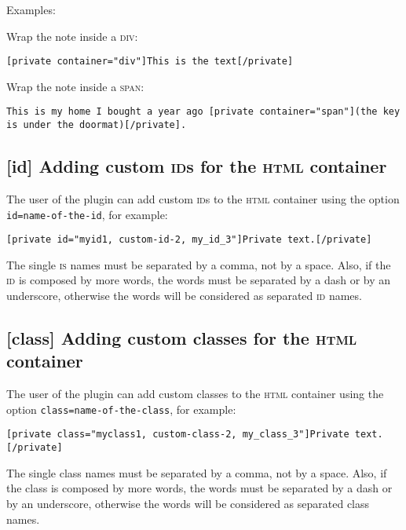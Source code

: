 \documentclass[
	titlepage,
	headinclude,
	abstract=on,
	paper=a4,
	fontsize=11pt,
]{scrartcl}
\begin{document}
Examples:

Wrap the note inside a \textsc{div}:

\begin{lstlisting}
[private container="div"]This is the text[/private]
\end{lstlisting}

Wrap the note inside a \textsc{span}:

\begin{lstlisting}
This is my home I bought a year ago [private container="span"](the key is under the doormat)[/private].
\end{lstlisting}


\subsection{[id] Adding custom \textsc{id}s for the \textsc{html} container}

The user of the plugin can add custom \textsc{id}s to the \textsc{html} container using the option \verb+id=name-of-the-id+, for example:

\begin{lstlisting}
[private id="myid1, custom-id-2, my_id_3"]Private text.[/private]
\end{lstlisting}

The single \textsc{is} names must be separated by a comma, not by a space. Also, if the \textsc{id} is composed by more words, the words must be separated by a dash or by an underscore, otherwise the words will be considered as separated \textsc{id} names.

\subsection{[class] Adding custom classes for the \textsc{html} container}

The user of the plugin can add custom classes to the \textsc{html} container using the option \verb+class=name-of-the-class+, for example:

\begin{lstlisting}
[private class="myclass1, custom-class-2, my_class_3"]Private text.[/private]
\end{lstlisting}

The single class names must be separated by a comma, not by a space. Also, if the class is composed by more words, the words must be separated by a dash or by an underscore, otherwise the words will be considered as separated class names.
\end{document}
